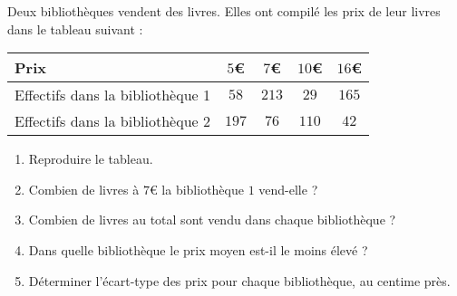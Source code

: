 \documentclass{beamer}
\begin{document}
\begin{frame}
	Deux bibliothèques vendent des livres. Elles ont compilé les prix de leur livres dans le tableau suivant :


	\begin{center}
		\begin{tabular}{|l|c|c|c|c|}
			\hline
			Prix                             & $5$€  & $7$€  & $10$€ & $16$€ \\ \hline
			Effectifs dans la bibliothèque 1 & $58$  & $213$ & $29$  & $165$ \\ \hline
			Effectifs dans la bibliothèque 2 & $197$ & $76$  & $110$ & $42$  \\ \hline
		\end{tabular}
	\end{center}

	\begin{enumerate}
		\item Reproduire le tableau.
		\item Combien de livres à $7$€ la bibliothèque $1$ vend-elle ? 
		\item Combien de livres au total sont vendu dans chaque bibliothèque ?
		\item Dans quelle bibliothèque le prix moyen est-il le moins élevé ?
		\item Déterminer l'écart-type des prix pour chaque bibliothèque, au centime près.
	\end{enumerate}
\end{frame}
\end{document}
